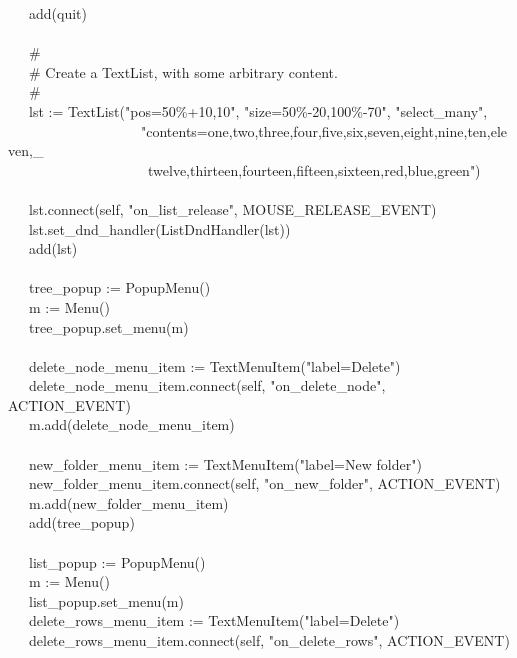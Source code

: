 {\>   \ \ \ add(quit) \\
\ \\
\>   \ \ \ \# \\
\>   \ \ \ \# Create a TextList, with some arbitrary content. \\
\>   \ \ \ \# \\
\>   \ \ \ lst :=
TextList("pos=50\%+10,10",
"size=50\%-20,100\%-70",
"select\_many", \\
\>   \ \ \ \ \ \ \ \ \ \ \ \ \ \ \ \ \ \ \ "contents=one,two,three,four,five,six,seven,eight,nine,ten,eleven,\_ \\
\>   \ \ \ \ \ \ \ \ \ \ \ \ \ \ \ \ \ \ \ \ twelve,thirteen,fourteen,fifteen,sixteen,red,blue,green") \\
\ \\
\>   \ \ \ lst.connect(self,
"on\_list\_release",
MOUSE\_RELEASE\_EVENT) \\
\>   \ \ \ lst.set\_dnd\_handler(ListDndHandler(lst)) \\
\>   \ \ \ add(lst) \\
\ \\
\>   \ \ \ tree\_popup := PopupMenu() \\
\>   \ \ \ m := Menu() \\
\>   \ \ \ tree\_popup.set\_menu(m) \\
\ \\
\>   \ \ \ delete\_node\_menu\_item :=
TextMenuItem("label=Delete") \\
\>   \ \ \ delete\_node\_menu\_item.connect(self,
"on\_delete\_node", ACTION\_EVENT) \\
\>   \ \ \ m.add(delete\_node\_menu\_item) \\
\ \\
\>   \ \ \ new\_folder\_menu\_item :=
TextMenuItem("label=New folder") \\
\>   \ \ \ new\_folder\_menu\_item.connect(self,
"on\_new\_folder", ACTION\_EVENT) \\
\>   \ \ \ m.add(new\_folder\_menu\_item) \\
\>   \ \ \ add(tree\_popup) \\
\ \\
\>   \ \ \ list\_popup := PopupMenu() \\
\>   \ \ \ m := Menu() \\
\>   \ \ \ list\_popup.set\_menu(m) \\
\>   \ \ \ delete\_rows\_menu\_item :=
TextMenuItem("label=Delete") \\
\>   \ \ \ delete\_rows\_menu\_item.connect(self,
"on\_delete\_rows", ACTION\_EVENT) \\
}
